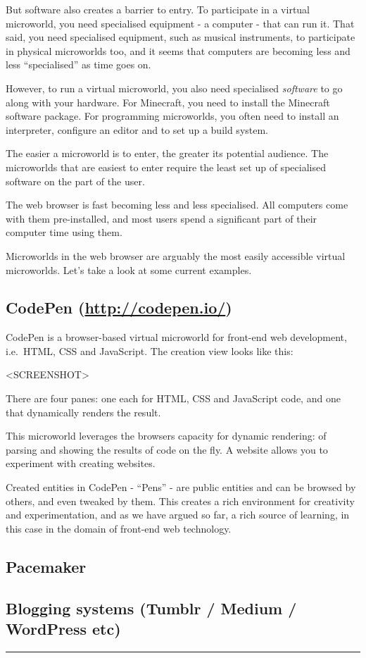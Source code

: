 But software also creates a barrier to entry. To participate in a
virtual microworld, you need specialised equipment - a computer - that
can run it. That said, you need specialised equipment, such as musical
instruments, to participate in physical microworlds too, and it seems
that computers are becoming less and less ``specialised'' as time goes
on.

However, to run a virtual microworld, you also need specialised
\emph{software} to go along with your hardware. For Minecraft, you need
to install the Minecraft software package. For programming microworlds,
you often need to install an interpreter, configure an editor and to set
up a build system.

The easier a microworld is to enter, the greater its potential audience.
The microworlds that are easiest to enter require the least set up of
specialised software on the part of the user.

The web browser is fast becoming less and less specialised. All
computers come with them pre-installed, and most users spend a
significant part of their computer time using them.

Microworlds in the web browser are arguably the most easily accessible
virtual microworlds. Let's take a look at some current examples.

\subsection{CodePen (\href{http://codepen.io/}{http://codepen.io/})}

CodePen is a browser-based virtual microworld for front-end web
development, i.e.~HTML, CSS and JavaScript. The creation view looks like
this:

\textless{}SCREENSHOT\textgreater{}

There are four panes: one each for HTML, CSS and JavaScript code, and
one that dynamically renders the result.

This microworld leverages the browsers capacity for dynamic rendering:
of parsing and showing the results of code on the fly. A website allows
you to experiment with creating websites.

Created entities in CodePen - ``Pens'' - are public entities and can be
browsed by others, and even tweaked by them. This creates a rich
environment for creativity and experimentation, and as we have argued so
far, a rich source of learning, in this case in the domain of front-end
web technology.

\subsection{Pacemaker}

\subsection{Blogging systems (Tumblr / Medium / WordPress etc)}

\begin{center}\rule{3in}{0.4pt}\end{center}
